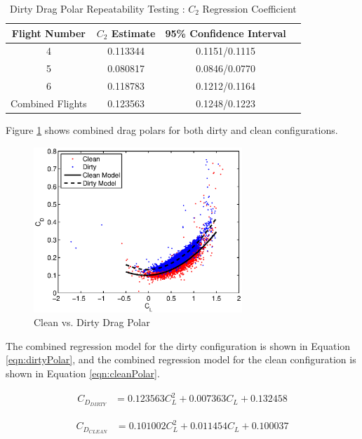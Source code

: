 \begin{table}[H]
\caption{Dirty Drag Polar Repeatability Testing : $C_2$ Regression Coefficient}
\label{table:k2RepeatDirty}
\centering
\begin{tabular}{c c c c}
\hline\hline
Flight Number & $C_2$ Estimate & 95\% Confidence Interval \\
 \hline
4 & 0.113344 & 0.1151/0.1115 \\
5 & 0.080817 & 0.0846/0.0770 \\
6 & 0.118783 & 0.1212/0.1164\\
\hline \hline
Combined Flights& 0.123563 & 0.1248/0.1223\\
\hline
\end{tabular}
\end{table}
\newpage
Figure \ref{fig:polarOverlay} shows combined drag polars for both dirty and clean configurations.
\begin{figure}[H]
  \centering
    \includegraphics[width=0.7\textwidth]{figures/polarOverlay.eps}
    \caption{Clean vs. Dirty Drag Polar} \label{fig:polarOverlay}
\end{figure}

The combined regression model for the dirty configuration is shown in Equation \ref{eqn:dirtyPolar}, and the combined regression model for the clean configuration is shown in Equation \ref{eqn:cleanPolar}.

\begin{align}
C_{D_{DIRTY}} &=   0.123563 C_L^2 + 0.007363 C_L + 0.132458
\label{eqn:dirtyPolar}
\end{align}

\begin{align}
C_{D_{CLEAN}} &=   0.101002 C_L^2 + 0.011454 C_L + 0.100037
\label{eqn:cleanPolar}
\end{align}

